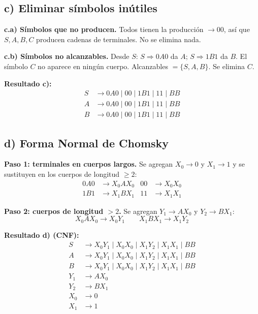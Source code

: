 \documentclass[11pt]{article}
\begin{document}
\subsection*{c) Eliminar s\'imbolos in\'utiles}

\textbf{c.a) S\'imbolos que no producen.} Todos tienen la producci\'on $\to 00$, as\'i que $S, A, B, C$ producen cadenas de terminales. No se elimina nada.

\textbf{c.b) S\'imbolos no alcanzables.} Desde $S$: $S \Rightarrow 0A0$ da $A$; $S \Rightarrow 1B1$ da $B$. El s\'imbolo $C$ no aparece en ning\'un cuerpo. Alcanzables $=\{S,A,B\}$. Se elimina $C$.

\textbf{Resultado c):}
\begin{align*}
S &\to 0A0 \mid 00 \mid 1B1 \mid 11 \mid BB\\
A &\to 0A0 \mid 00 \mid 1B1 \mid 11 \mid BB\\
B &\to 0A0 \mid 00 \mid 1B1 \mid 11 \mid BB
\end{align*}

\subsection*{d) Forma Normal de Chomsky}

\textbf{Paso 1: terminales en cuerpos largos.} Se agregan $X_0 \to 0$ y $X_1 \to 1$ y se sustituyen en los cuerpos de longitud $\ge 2$:
\begin{align*}
0A0 &\to X_0 A X_0 & 00 &\to X_0 X_0\\
1B1 &\to X_1 B X_1 & 11 &\to X_1 X_1
\end{align*}

\textbf{Paso 2: cuerpos de longitud $>2$.} Se agregan $Y_1 \to A X_0$ y $Y_2 \to B X_1$:
\[ X_0 A X_0 \to X_0 Y_1 \qquad X_1 B X_1 \to X_1 Y_2 \]

\textbf{Resultado d) (CNF):}
\begin{align*}
S &\to X_0 Y_1 \mid X_0 X_0 \mid X_1 Y_2 \mid X_1 X_1 \mid BB\\
A &\to X_0 Y_1 \mid X_0 X_0 \mid X_1 Y_2 \mid X_1 X_1 \mid BB\\
B &\to X_0 Y_1 \mid X_0 X_0 \mid X_1 Y_2 \mid X_1 X_1 \mid BB\\
Y_1 &\to A X_0\\
Y_2 &\to B X_1\\
X_0 &\to 0\\
X_1 &\to 1
\end{align*}

\newpage
\end{document}

